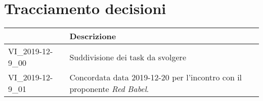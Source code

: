 \section{Tracciamento decisioni}
\renewcommand{\arraystretch}{1.8}

  \begin{longtable}{|p{5cm}|p{9cm}|}
    \hline

    \rowcolor{header}
    \centering{\textbf{Codice}} &  \textbf{Descrizione}\\

    \hline

    VI\_2019-12-9\_00 & Suddivisione dei task da svolgere  \\
    VI\_2019-12-9\_01 & Concordata data 2019-12-20 per l'incontro con il proponente \textit{Red Babel}.  \\

    \hline
  \end{longtable}

